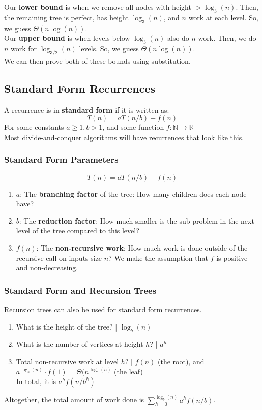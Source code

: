 \documentclass{article}
\begin{document}
Our \textbf{lower bound} is when we remove all nodes with height $> \log_3(n)$. Then, the remaining tree is perfect, has height $\log_3(n)$, and $n$ work at each level. So, we guess $\Theta(n \log(n))$.\\
Our \textbf{upper bound} is when levels below $\log_3(n)$ also do $n$ work. Then, we do $n$ work for $\log_{3/2}(n)$ levels. So, we guess $\Theta(n \log(n))$.\\
We can then prove both of these bounds using substitution.

\subsection{Standard Form Recurrences}
A recurrence is in \textbf{standard form} if it is written as:
$$T(n) = aT(n/b) + f(n)$$
For some constants $a \geq 1, b > 1$, and some function $f: \mathbb{N} \to \mathbb{R}$\\
Most divide-and-conquer algorithms will have recurrences that look like this.

\subsubsection{Standard Form Parameters}
$$T(n) = aT(n/b) + f(n)$$
\begin{enumerate}
    \item $a$: The \textbf{branching factor} of the tree: How many children does each node have?
    
    \item $b$: The \textbf{reduction factor}: How much smaller is the sub-problem in the next level of the tree compared to this level?
    
    \item $f(n)$: The \textbf{non-recursive work}: How much work is done outside of the recursive call on inputs size $n$? We make the assumption that $f$ is positive and non-decreasing.
\end{enumerate}

\subsubsection{Standard Form and Recursion Trees}
Recursion trees can also be used for standard form recurrences.
\begin{enumerate}
    \item What is the height of the tree? | $\log_b(n)$
    \item What is the number of vertices at height $h$? | $a^h$
    \item Total non-recursive work at level $h$? | $f(n)$ (the root), and $a^{\log_b(n)} \cdot f(1) = \Theta(n^{\log_b(a)}$ (the leaf)\\
    In total, it is $a^h f(n/b^h)$
\end{enumerate}
Altogether, the total amount of work done is $\sum_{h = 0}^{\log_b(n)} a^h f(n/b)$.
\end{document}
